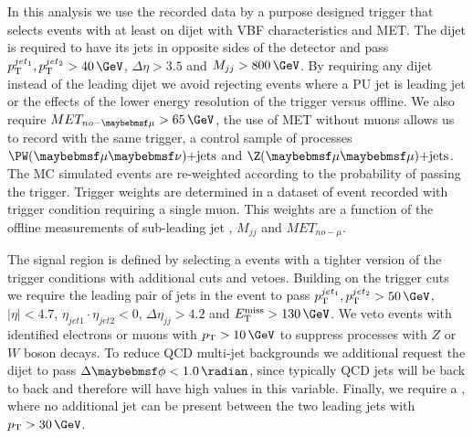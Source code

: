 In this analysis we use the recorded data by a purpose designed trigger that selects events with at least on dijet with \gls{VBF} characteristics and \gls{MET}. The dijet is required to have its jets in opposite sides of the detector and pass $\pt^{jet_1},\pt^{jet_2} > 40\,\GeV$, $\Delta\eta > 3.5$ and $M_{jj} > 800\,\GeV$. By requiring any dijet instead of the leading dijet we avoid rejecting events where a \gls{PU} jet is leading jet or the effects of the lower energy resolution of the trigger versus offline. We also require $MET_{no-\mu} > 65\,\GeV$, the use of \gls{MET} without muons allows us to record with the same trigger, a control sample of processes  $\PW(\mu\nu)\text{+jets}$ and $\Z(\mu\mu)\text{+jets}$. The \gls{MC} simulated events are re-weighted according to the probability of passing the trigger. Trigger weights are determined in a dataset of event recorded with trigger condition requiring a single muon. This weights are a function of the offline measurements of sub-leading jet \pt, $M_{jj}$ and $MET_{no-\mu}$.


The signal region is defined by selecting a events with a tighter version of the trigger conditions with additional cuts and vetoes. Building on the trigger cuts we require the leading pair of jets in the event to pass $\pt^{jet_1},\pt^{jet_2} > 50\,\GeV$, $|\eta| < 4.7$, $\eta_{jet1} \cdot \eta_{jet2} < 0$, $\Delta\eta_{jj}>4.2$ and $\MET > 130\,\GeV$. We veto events with identified electrons or muons  with $\pt>10\,\GeV$ to suppress processes with $Z$ or $W$ boson decays. To reduce \gls{QCD} multi-jet backgrounds we additional request the dijet to pass $\Delta\phi < 1.0\,\radian$, since typically \gls{QCD} jets will be back to back and therefore will have high values in this variable. Finally, we require a , where no additional jet can be present between the two leading jets with $\pt > 30\,\GeV$.


